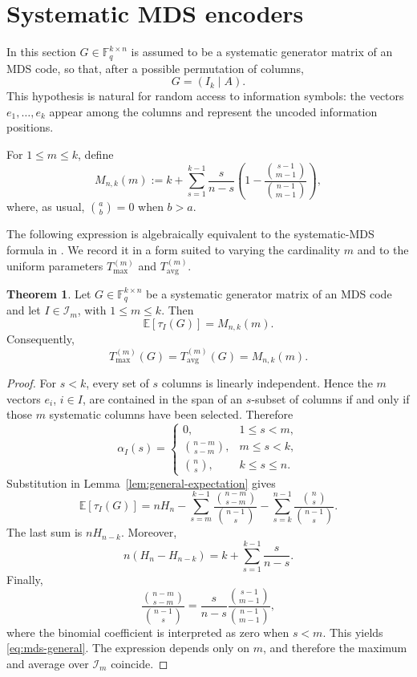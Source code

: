 \documentclass[11pt,a4paper]{article}
\numberwithin{equation}{section}
\theoremstyle{definition}
\theoremstyle{definition}
\newtheorem{theorem}[definition]{Theorem}
\newcommand{\F}{\mathbb{F}}
\newcommand{\E}{\mathbb{E}}
\newcommand{\cI}{\mathcal{I}}
\newcommand{\Tmax}{T_{\max}}
\newcommand{\Tavg}{T_{\mathrm{avg}}}
\begin{document}
\section{Systematic MDS encoders}\label{sec:mds}

In this section $G\in \F_q^{k\times n}$ is assumed to be a systematic generator matrix of an MDS code, so that, after a possible permutation of columns,
\[
G=(I_k\mid A).
\]
This hypothesis is natural for random access to information symbols: the vectors $e_1,\ldots,e_k$ appear among the columns and represent the uncoded information positions.

For $1\leq m\leq k$, define
\begin{equation}\label{eq:def-mds-value}
M_{n,k}(m):=
k+\sum_{s=1}^{k-1}\frac{s}{n-s}
\left(1-\frac{\binom{s-1}{m-1}}{\binom{n-1}{m-1}}\right),
\end{equation}
where, as usual, $\binom{a}{b}=0$ when $b>a$.

{The following expression is algebraically equivalent to the systematic-MDS formula in \cite[Propositions~23 and~24]{BarLev2026CodedRetrieval}.  We record it in a form suited to varying the cardinality $m$ and to the uniform parameters $\Tmax^{(m)}$ and $\Tavg^{(m)}$.}

\begin{theorem}\label{thm:mds-general}
Let $G\in \F_q^{k\times n}$ be a systematic generator matrix of an MDS code and let $I\in \cI_m$, with $1\leq m\leq k$.  Then
\begin{equation}\label{eq:mds-general}
\E[\tau_I(G)]
=
M_{n,k}(m).
\end{equation}
Consequently,
\[
\Tmax^{(m)}(G)=\Tavg^{(m)}(G)=M_{n,k}(m).
\]
\end{theorem}

\begin{proof}
For $s<k$, every set of $s$ columns is linearly independent.  Hence the $m$ vectors $e_i$, $i\in I$, are contained in the span of an $s$-subset of columns if and only if those $m$ systematic columns have been selected.  Therefore
\[
\alpha_I(s)=
\begin{cases}
0, & 1\le s<m,\\[2mm]
\binom{n-m}{s-m}, & m\le s<k,\\[2mm]
\binom ns, & k\le s\le n.
\end{cases}
\]
Substitution in Lemma~\ref{lem:general-expectation} gives
\[
\E[\tau_I(G)]
=nH_n-
\sum_{s=m}^{k-1}\frac{\binom{n-m}{s-m}}{\binom{n-1}{s}}
-
\sum_{s=k}^{n-1}\frac{\binom ns}{\binom{n-1}{s}}.
\]
The last sum is $nH_{n-k}$.  Moreover,
\[
n(H_n-H_{n-k})=k+\sum_{s=1}^{k-1}\frac{s}{n-s}.
\]
Finally,
\[
\frac{\binom{n-m}{s-m}}{\binom{n-1}{s}}
=\frac{s}{n-s}\frac{\binom{s-1}{m-1}}{\binom{n-1}{m-1}},
\]
where the binomial coefficient is interpreted as zero when $s<m$.  This yields \eqref{eq:mds-general}.  The expression depends only on $m$, and therefore the maximum and average over $\cI_m$ coincide.
\end{proof}
\end{document}
